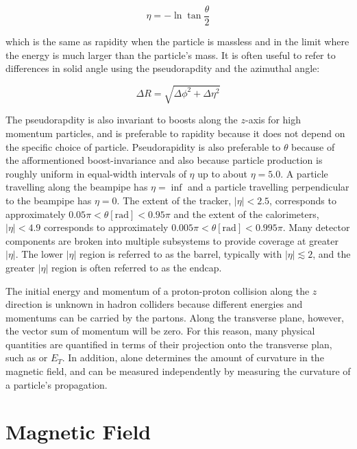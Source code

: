 \begin{equation}\label{eq:pseudorapidity}
\eta = - \ln \tan \frac{\theta}{2}
\end{equation}

\noindent which is the same as rapidity when the particle is massless and in the limit where the energy is much larger than the particle's mass.
It is often useful to refer to differences in solid angle using the pseudorapdity and the azimuthal angle:

\begin{equation}\label{eq:deltar}
\Delta R = \sqrt{\Delta \phi^2 + \Delta \eta^2}
\end{equation}


The pseudorapdity is also invariant to boosts along the $z$-axis for high momentum particles, and is preferable to rapidity because it does not depend on the specific choice of particle.
Pseudorapidity is also preferable to $\theta$ because of the afformentioned boost-invariance and also because particle production is roughly uniform in equal-width intervals of $\eta$ up to about $\eta = 5.0$. 
A particle travelling along the beampipe has $\eta = \inf$ and a particle travelling perpendicular to the beampipe has $\eta = 0$.
The extent of the tracker, $|\eta| < 2.5$, corresponds to approximately $0.05 \pi < \theta [\mathrm{rad}] < 0.95 \pi$ and the extent of the calorimeters, $|\eta| < 4.9$ corresponds to approximately $0.005 \pi < \theta [\mathrm{rad}] < 0.995 \pi$.
Many detector components are broken into multiple subsystems to provide coverage at greater $|\eta|$.
The lower $|\eta|$ region is referred to as the barrel, typically with $|\eta| \lesssim 2$, and the greater $|\eta|$ region is often referred to as the endcap.

The initial energy and momentum of a proton-proton collision along the $z$ direction is unknown in hadron colliders because different energies and momentums can be carried by the partons.
Along the transverse plane, however, the vector sum of momentum will be zero.
For this reason, many physical quantities are quantified in terms of their projection onto the transverse plan, such as \pt or $E_T$.
In addition, \pt alone determines the amount of curvature in the magnetic field, and can be measured independently by measuring the curvature of a particle's propagation.


\section{Magnetic Field}
\label{sec:magnetic_field}

